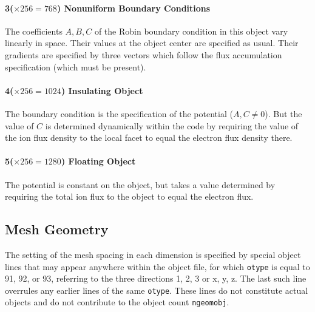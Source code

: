 \documentclass[12pt]{article}
\begin{document}
\paragraph{3($\times256=768$) Nonuniform Boundary Conditions} The
coefficients $A,B,C$ of the Robin boundary condition in this object vary
linearly in space. Their values at the object center are specified as
usual. Their gradients are specified by three vectors which follow the
flux accumulation specification (which must be present).

\paragraph{4($\times256=1024$) Insulating Object} The boundary
condition is the specification of the potential ($A,C\ne 0$). But the
value of $C$ is determined dynamically within the code by requiring
the value of the ion flux density to the local facet to equal the
electron flux density there.

\paragraph{5($\times256=1280$) Floating Object} The potential is constant
on the object, but takes a value determined by requiring the total ion
flux to the object to equal the electron flux.

\subsection{Mesh Geometry}

The setting of the mesh spacing in each dimension is specified by
special object lines that may appear anywhere within the object file,
for which \verb!otype! is equal to 91, 92, or 93, referring to the
three directions 1, 2, 3 or x, y, z. The last such line overrules any
earlier lines of the same \verb!otype!. These lines do not constitute
actual objects and do not contribute to the object count
\verb!ngeomobj!.
\end{document}
